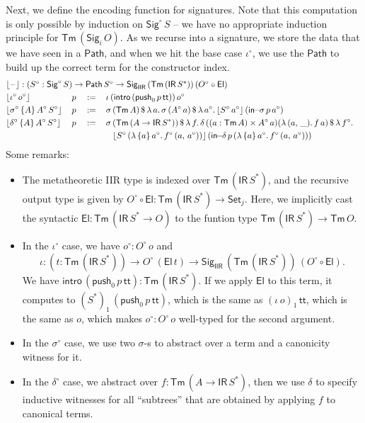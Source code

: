 \documentclass[acmsmall,screen,review,anonymous]{acmart}
\newcommand{\msf}[1]{{\mathsf{#1}}}
\newcommand{\push}{\mathsf{push}}
\newcommand{\Set}{\msf{Set}}
\newcommand{\El}{\msf{El}}
\newcommand{\Sig}{\msf{Sig}}
\newcommand{\ttt}{\msf{tt}}
\newcommand{\blank}{{\mathord{\hspace{1pt}\text{--}\hspace{1pt}}}}
\newcommand{\IR}{\msf{IR}}
\newcommand{\intro}{\msf{intro}}
\newcommand{\IIR}{\msf{IIR}}
\newcommand{\floord}[1]{\lfloor #1 \rfloor}
\newcommand{\Tm}{\msf{Tm}}
\newcommand{\w}{\circ}
\newcommand{\Path}{\msf{Path}}
\newcommand{\insigma}{\msf{in}\!\!-\!\!\sigma}
\newcommand{\indelta}{\msf{in}\!\!-\!\!\delta}
\begin{document}
\begin{definition}
Next, we define the encoding function for signatures.
Note that this computation is only possible by induction on $\Sig^\w\,S$ \--- we have no appropriate
induction principle for $\Tm\,(\Sig_i\,O)$.  As we recurse into a signature, we store the
data that we have seen in a $\Path$, and when we hit the base case $\iota^\w$, we use the $\Path$ to
build up the correct term for the constructor index.
\begin{alignat*}{5}
  &\rlap{$\floord{\blank} : (S^\w : \Sig^\w\,S) \to \Path\,S^\w \to \Sig_\IIR\,(\Tm\,(\IR\,S^*))\,(O^\w\circ \El)$}\\
  &\floord{\iota^\w\,o^\w}\,&&p               &&:=\,&&\iota\,(\intro\,(\push_0\,p\,\ttt))\,o^\w\\
  &\floord{\sigma^\w\,\{A\}\,A^\w\,S^\w}\,&&p &&:=\,&&\sigma\,(\Tm\,A)\,\$\,\lambda\,a.\,\sigma\,(A^\w\,a)\,\$\,\lambda\,a^\w.\,\floord{S^\w\,a^\w}\,(\insigma\,p\,a^\w)\\
  &\floord{\delta^\w\,\{A\}\,A^\w\,S^\w}\,&&p &&:=\,&&\sigma\,(\Tm\,(A \to \IR\,S^*))\,\$\,\lambda\,f.\,\delta\,((a : \Tm\,A) \times A^\w\,a) (\lambda\,(a,\,\_).\,f\,a)\,\$\,\lambda\,f^\w.\\
  &                       &&              &&   &&\hspace{0.8em}\floord{S^\w\,(\lambda\,\{a\}\,a^\w.\,f^\w\,(a,\,a^\w))}\,(\indelta\,p\,(\lambda\,\{a\}\,a^\w.\,f^\w\,(a,\,a^\w)))
\end{alignat*}
Some remarks:
\begin{itemize}
  \item The metatheoretic IIR type is indexed over $\Tm\,(\IR\,S^*)$, and the recursive output type
    is given by $O^\w\circ \El : \Tm\,(\IR\,S^*) \to \Set_j$. Here, we implicitly cast the syntactic
    $\El : \Tm\,(\IR\,S^* \to O)$ to the funtion type $\Tm\,(\IR\,S^*) \to \Tm\,O$.
  \item In the $\iota^\w$ case, we have $o^\w : O^\w\,o$ and
    \[ \iota : (t : \Tm\,(\IR\,S^*)) \to O^\w\,(\El\,t) \to \Sig_\IIR\,(\Tm\,(\IR\,S^*))\,(O^\w\circ \El). \]
    We have $\intro\,(\push_0\,p\,\ttt) : \Tm\,(\IR\,S^*)$. If we apply $\El$ to this term, it computes
    to $(S^*)_1\,(\push_0\,p\,\ttt)$, which is the same as $(\iota\,o)_1\,\ttt$, which is the same
    as $o$, which makes $o^\w : O^\w\,o$ well-typed for the second argument.
  \item In the $\sigma^\w$ case, we use two $\sigma$-s to abstract over a term and a canonicity witness for it.
  \item In the $\delta^\w$ case, we abstract over $f : \Tm\,(A \to \IR\,S^*)$, then we use $\delta$ to specify inductive
        witnesses for all ``subtrees'' that are obtained by applying $f$ to canonical terms.
\end{itemize}
\end{definition}
\end{document}

